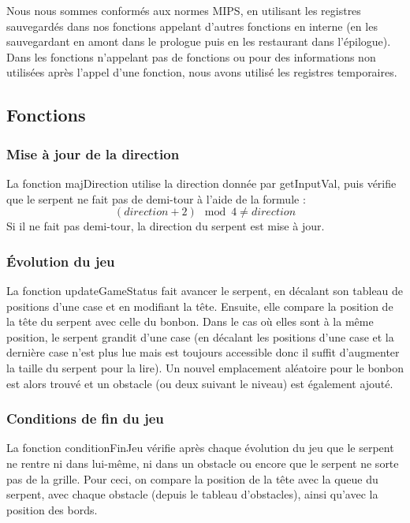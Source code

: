 \documentclass[a4paper]{article}
\begin{document}
Nous nous sommes conformés aux normes MIPS, en utilisant les registres sauvegardés
dans nos fonctions appelant d'autres fonctions en interne (en les sauvegardant en amont dans le prologue puis en les restaurant dans l'épilogue).
Dans les fonctions n'appelant pas de fonctions ou pour des informations non utilisées après l'appel d'une fonction,
nous avons utilisé les registres temporaires.


\subsection{Fonctions}

\subsubsection*{Mise à jour de la direction}
La fonction majDirection utilise la direction donnée par getInputVal, puis vérifie que le serpent ne fait pas de demi-tour à l'aide de la formule : 
\[(direction+2)\mod{4} \neq direction\]
Si il ne fait pas demi-tour, la direction du serpent est mise à jour.

\subsubsection*{Évolution du jeu}
La fonction updateGameStatus fait avancer le serpent, en décalant son tableau de positions d'une case et en modifiant la tête.
Ensuite, elle compare la position de la tête du serpent avec celle du bonbon. Dans le cas où elles sont à la même position, 
le serpent grandit d'une case (en décalant les positions d'une case et la dernière case n'est plus lue mais est toujours accessible 
donc il suffit d'augmenter la taille du serpent pour la lire). Un nouvel emplacement aléatoire pour le bonbon est alors trouvé et un obstacle (ou deux suivant le niveau) 
est également ajouté.

\subsubsection*{Conditions de fin du jeu}
La fonction conditionFinJeu vérifie après chaque évolution du jeu que le serpent ne rentre ni dans lui-même, ni dans un obstacle ou encore que le serpent ne sorte pas de 
la grille. Pour ceci, on compare la position de la tête avec la queue du serpent, avec chaque obstacle (depuis le tableau d'obstacles), ainsi qu'avec la position des bords.
\end{document}
